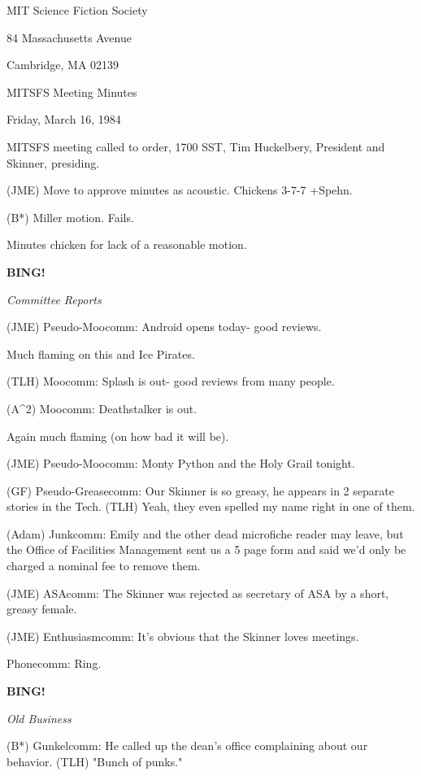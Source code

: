 \documentclass[12pt]{article}
\newcommand{\bing}{{\bf BING!} }
\newcommand{\goto}[1]{\bing \vskip 12pt \centerline{{\em{#1}}}}
\begin{document}
\begin{center}

MIT Science Fiction Society 

84 Massachusetts Avenue

Cambridge, MA 02139

\vspace{12pt}

MITSFS Meeting Minutes 

Friday, March 16, 1984

\end{center}
 
\vspace{18pt}

\setlength{\parskip}{6pt}

\noindent
MITSFS meeting called to order, 1700 SST,
Tim Huckelbery, President and Skinner, presiding.

(JME) Move to approve minutes as acoustic. Chickens 3-7-7 +Spehn.

(B*) Miller motion. Fails.

Minutes chicken for lack of a reasonable motion.

\goto{Committee Reports}

(JME) Pseudo-Moocomm: Android opens today- good reviews.

Much flaming on this and Ice Pirates.

(TLH) Moocomm: Splash is out- good reviews from many people.

(A^2) Moocomm: Deathstalker is out.

Again much flaming (on how bad it will be).

(JME) Pseudo-Moocomm: Monty Python and the Holy Grail tonight.

(GF) Pseudo-Greasecomm: Our Skinner is so greasy, he appears in 2 separate stories in the Tech. (TLH) Yeah, they even spelled my name right in one of them.

(Adam) Junkcomm: Emily and the other dead microfiche reader may leave, but the Office of Facilities Management sent us a 5 page form and said we'd only be charged a nominal fee to remove them.

(JME) ASAcomm: The Skinner was rejected as secretary of ASA by a short, greasy female.

(JME) Enthusiasmcomm: It's obvious that the Skinner loves meetings.

Phonecomm: Ring.

\goto{Old Business}

(B*) Gunkelcomm: He called up the dean's office complaining about our behavior. (TLH) "Bunch of punks."
\end{document}
